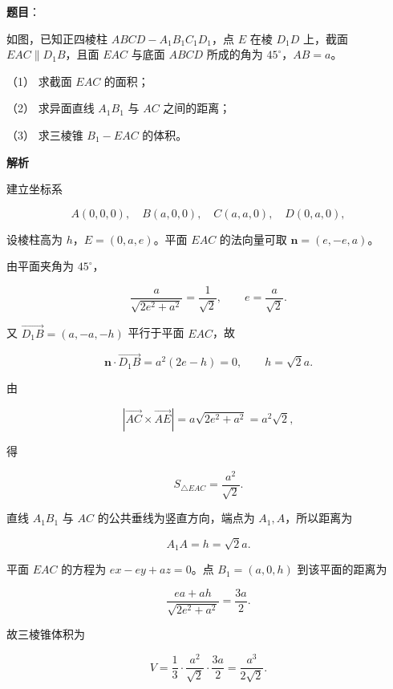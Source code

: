 \begin{answer}

\textbf{题目}：

如图，已知正四棱柱 $ABCD-A_1B_1C_1D_1$，点 $E$ 在棱 $D_1D$ 上，截面 $EAC\parallel D_1B$，且面 $EAC$ 与底面 $ABCD$ 所成的角为 $45^\circ$，$AB=a$。

（1） 求截面 $EAC$ 的面积；

（2） 求异面直线 $A_1B_1$ 与 $AC$ 之间的距离；

（3） 求三棱锥 $B_1-EAC$ 的体积。
\nopagebreak[4]
\begin{center}\end{center}
\nopagebreak[4]
\textbf{解析}

建立坐标系

\nopagebreak[4]
\[
A(0,0,0),\quad B(a,0,0),\quad C(a,a,0),\quad D(0,a,0),
\]

设棱柱高为 $h$，$E=(0,a,e)$。平面 $EAC$ 的法向量可取 $\mathbf n=(e,-e,a)$。

由平面夹角为 $45^\circ$，

\nopagebreak[4]
\[
\frac a{\sqrt{2e^2+a^2}}=\frac1{\sqrt2},
\qquad e=\frac a{\sqrt2}.
\]

又 $\overrightarrow{D_1B}=(a,-a,-h)$ 平行于平面 $EAC$，故

\nopagebreak[4]
\[
\mathbf n\cdot\overrightarrow{D_1B}=a^2(2e-h)=0,
\qquad h=\sqrt2a.
\]


由

\nopagebreak[4]
\[
\left|\overrightarrow{AC}\times\overrightarrow{AE}\right|
=a\sqrt{2e^2+a^2}=a^2\sqrt2,
\]

得

\nopagebreak[4]
\[
S_{\triangle EAC}=\frac{a^2}{\sqrt2}.
\]


直线 $A_1B_1$ 与 $AC$ 的公共垂线为竖直方向，端点为 $A_1,A$，所以距离为

\nopagebreak[4]
\[
A_1A=h=\sqrt2a.
\]


平面 $EAC$ 的方程为 $ex-ey+az=0$。点 $B_1=(a,0,h)$ 到该平面的距离为

\nopagebreak[4]
\[
\frac{ea+ah}{\sqrt{2e^2+a^2}}=\frac{3a}{2}.
\]

故三棱锥体积为

\nopagebreak[4]
\[
V=\frac13\cdot\frac{a^2}{\sqrt2}\cdot\frac{3a}{2}
=\frac{a^3}{2\sqrt2}.
\]




\end{answer}
